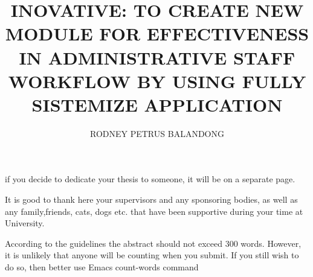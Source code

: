 \raggedbottom 

\title{INOVATIVE: TO CREATE NEW MODULE FOR EFFECTIVENESS IN ADMINISTRATIVE STAFF WORKFLOW BY USING FULLY SISTEMIZE APPLICATION}

\author{RODNEY PETRUS BALANDONG}




\copyrightyear{\number\the\year} %



\beforepreface %


\clearpage
\begin{center}
if you decide to dedicate your thesis to someone, it will be on a separate page.
\end{center}

\renewcommand\listtablename{\fontsize{14}{13.6}\selectfont\centering\vspace*{-0.5in} ACKNOWLEDGEMENTS}
\begin{singlespace} 


It is good to thank here your supervisors and any sponsoring bodies, as well as any family,friends, cats, dogs etc. that have been supportive during your time at University.
\end{singlespace}
\iftablespage
{}
{}%

\renewcommand\listtablename{\normalsize\normalfont\centering\vspace*{-0.5in} ABSTRACT}
\iftablespage
{}
{}

According to the guidelines the abstract should not exceed 300 words. However, it is unlikely that anyone will be counting when you submit. If you still wish to do so, then better use Emacs count-words command 

\afterpreface  %